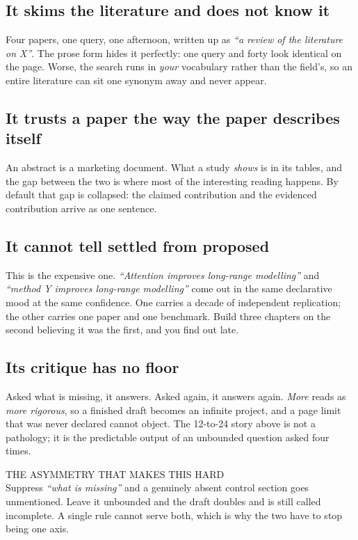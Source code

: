 \documentclass[11pt,a4paper]{article}
\newcommand{\lab}[1]{{\labelfont\fontsize{7.4}{9}\selectfont\color{accent}#1}}
\begin{document}
\subsection{It skims the literature and does not know it}
Four papers, one query, one afternoon, written up as \emph{“a review of the literature on X”}.
The prose form hides it perfectly: one query and forty look identical on the page. Worse, the
search runs in \emph{your} vocabulary rather than the field's, so an entire literature can sit
one synonym away and never appear.

\subsection{It trusts a paper the way the paper describes itself}
An abstract is a marketing document. What a study \emph{shows} is in its tables, and the gap
between the two is where most of the interesting reading happens. By default that gap is
collapsed: the claimed contribution and the evidenced contribution arrive as one sentence.

\subsection{It cannot tell settled from proposed}
This is the expensive one. \emph{“Attention improves long-range modelling”} and \emph{“method Y
improves long-range modelling”} come out in the same declarative mood at the same confidence.
One carries a decade of independent replication; the other carries one paper and one benchmark.
Build three chapters on the second believing it was the first, and you find out late.

\subsection{Its critique has no floor}
Asked what is missing, it answers. Asked again, it answers again. \emph{More} reads as \emph{more
rigorous}, so a finished draft becomes an infinite project, and a page limit that was never
declared cannot object. The 12-to-24 story above is not a pathology; it is the predictable
output of an unbounded question asked four times.

\begin{pull}
\lab{THE ASYMMETRY THAT MAKES THIS HARD}\\[0.5em]
Suppress \emph{“what is missing”} and a genuinely absent control section goes unmentioned. Leave
it unbounded and the draft doubles and is still called incomplete. A single rule cannot serve
both, which is why the two have to stop being one axis.
\end{pull}
\end{document}
